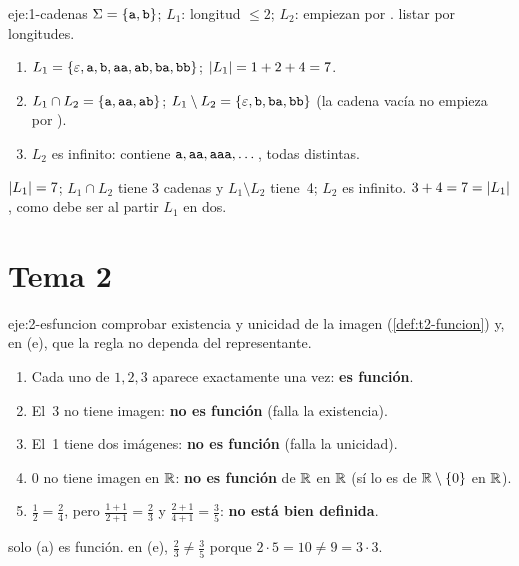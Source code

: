 \begin{solucion}{eje:1-cadenas}
\datos $\Sigma=\{\texttt{a},\texttt{b}\}$; $L_1$: longitud $\le2$; $L_2$: empiezan por .
\planteamiento listar por longitudes.
\pasos
\begin{enumerate}[label=(\alph*)]
  \item $L_1=\{\varepsilon,\texttt{a},\texttt{b},\texttt{aa},\texttt{ab},\texttt{ba},\texttt{bb}\}$; $\lvert L_1\rvert=1+2+4=7$.
  \item $L_1\cap L_2=\{\texttt{a},\texttt{aa},\texttt{ab}\}$; $L_1\setminus L_2=\{\varepsilon,\texttt{b},\texttt{ba},\texttt{bb}\}$ (la cadena vacía no empieza por ).
  \item $L_2$ es infinito: contiene $\texttt{a},\texttt{aa},\texttt{aaa},\dots$, todas distintas.
\end{enumerate}
\resultado $\lvert L_1\rvert=7$; $L_1\cap L_2$ tiene 3 cadenas y $L_1\setminus L_2$ tiene~4; $L_2$ es infinito.
\comprobacion $3+4=7=\lvert L_1\rvert$, como debe ser al partir $L_1$ en dos.
\end{solucion}

\section{Tema 2}

\begin{solucion}{eje:2-esfuncion}
\planteamiento comprobar existencia y unicidad de la imagen (\cref{def:t2-funcion}) y, en (e), que la regla no dependa del representante.
\pasos
\begin{enumerate}[label=(\alph*)]
  \item Cada uno de $1,2,3$ aparece exactamente una vez: \textbf{es función}.
  \item El~3 no tiene imagen: \textbf{no es función} (falla la existencia).
  \item El~1 tiene dos imágenes: \textbf{no es función} (falla la unicidad).
  \item $0$ no tiene imagen en $\mathbb{R}$: \textbf{no es función} de $\mathbb{R}$ en $\mathbb{R}$ (sí lo es de $\mathbb{R}\setminus\{0\}$ en $\mathbb{R}$).
  \item $\tfrac12=\tfrac24$, pero $\tfrac{1+1}{2+1}=\tfrac23$ y $\tfrac{2+1}{4+1}=\tfrac35$: \textbf{no está bien definida}.
\end{enumerate}
\resultado solo (a) es función.
\comprobacion en (e), $\tfrac23\neq\tfrac35$ porque $2\cdot5=10\neq9=3\cdot3$.
\end{solucion}

